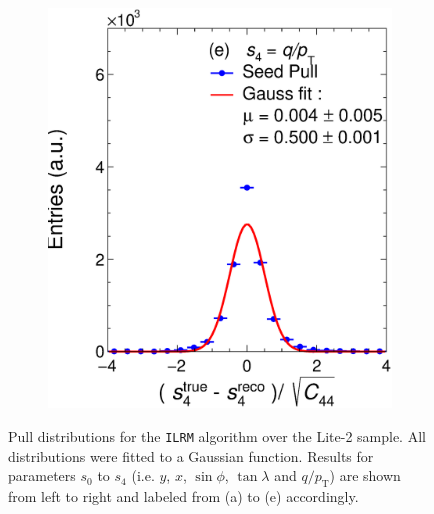 \begin{figure}[t]
\begin{subfigure}{0.32\textwidth}
         \includegraphics[width=\textwidth]{figures/ch4-KF_NDGArLite/MC/ILRM+KF/UnitSeed_p4.eps}
         \caption{}
         \label{fig:resp4Seed_GArLite_ILRM+KF}
     \end{subfigure}
        \caption[Pull distributions for the \texttt{ILRM} algorithm over the Lite-2 sample]{Pull distributions for the \texttt{ILRM} algorithm over the Lite-2 sample. All distributions were fitted to a Gaussian function. Results for parameters $s_0$ to $s_4$ (i.e. $y$, $x$, $\sin\phi$, $\tan\lambda$ and $q/p_{\text{T}}$) are shown from left to right and labeled from (a) to (e) accordingly. }
        \label{fig:MCUnitSeed_GArLite_ILRM+KF}
\end{figure}

